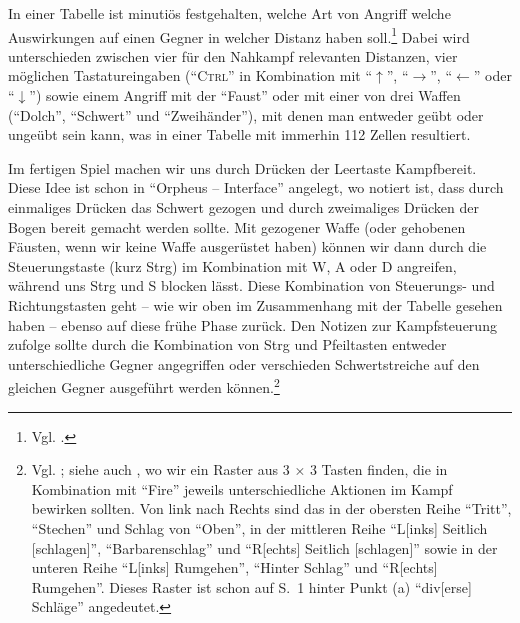 \documentclass[a5paper,pagesize]{scrbook}
\begin{document}
In einer Tabelle ist minutiös festgehalten, welche Art von Angriff welche Auswirkungen auf einen Gegner in welcher Distanz haben soll.\footnote{Vgl. \autocite[S.~4--5]{orpheus_kampfsteuerung}.}
Dabei wird unterschieden zwischen vier für den Nahkampf relevanten Distanzen, vier möglichen Tastatureingaben (\enquote{\textsc{Ctrl}} in Kombination mit \enquote{$\uparrow$}, \enquote{$\rightarrow$}, \enquote{$\leftarrow$} oder \enquote{$\downarrow$}) sowie einem Angriff mit der \enquote{Faust} oder mit einer von drei Waffen (\enquote{Dolch}, \enquote{Schwert} und \enquote{Zweihänder}), mit denen man entweder geübt oder ungeübt sein kann, was in einer Tabelle mit immerhin 112 Zellen resultiert.\autocite[S.~4]{orpheus_kampfsteuerung}

Im fertigen Spiel machen wir uns durch Drücken der Leertaste Kampfbereit.
Diese Idee ist schon in \enquote{Orpheus -- Interface} angelegt, wo notiert ist, dass durch einmaliges Drücken das Schwert gezogen und durch zweimaliges Drücken der Bogen bereit gemacht werden sollte.\autocite[S.~2]{orpheus_interface}
Mit gezogener Waffe (oder gehobenen Fäusten, wenn wir keine Waffe ausgerüstet haben) können wir dann durch die Steuerungstaste (kurz Strg) im Kombination mit W, A oder D angreifen, während uns Strg und S blocken lässt.
Diese Kombination von Steuerungs- und Richtungstasten geht -- wie wir oben im Zusammenhang mit der Tabelle gesehen haben -- ebenso auf diese frühe Phase zurück.
Den Notizen zur Kampfsteuerung zufolge sollte durch die Kombination von Strg und Pfeiltasten entweder unterschiedliche Gegner angegriffen oder verschieden Schwertstreiche auf den gleichen Gegner ausgeführt werden können.\footnote{Vgl. \autocite[S.~1--3]{orpheus_kampfsteuerung}; siehe auch \autocite[S.~4]{orpheus_interface}, wo wir ein Raster aus 3 × 3 Tasten finden, die in Kombination mit \enquote{Fire} jeweils unterschiedliche Aktionen im Kampf bewirken sollten. Von link nach Rechts sind das in der obersten Reihe \enquote{Tritt}, \enquote{Stechen} und Schlag von \enquote{Oben}, in der mittleren Reihe \enquote{L[inks] Seitlich [schlagen]}, \enquote{Barbarenschlag} und \enquote{R[echts] Seitlich [schlagen]} sowie in der unteren Reihe \enquote{L[inks] Rumgehen}, \enquote{Hinter Schlag} und \enquote{R[echts] Rumgehen}. Dieses Raster ist schon auf S.~1 hinter Punkt (a) \enquote{div[erse] Schläge} angedeutet.}
\end{document}
